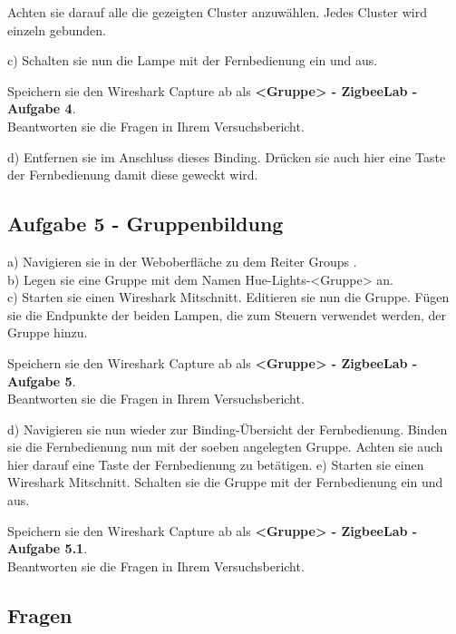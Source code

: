 Achten sie darauf alle die gezeigten Cluster anzuwählen. Jedes Cluster wird einzeln gebunden.

c) Schalten sie nun die Lampe mit der Fernbedienung ein und aus. 

\begin{Hinweis}
    Speichern sie den Wireshark Capture ab als \textbf{\grqq <Gruppe> - ZigbeeLab - Aufgabe 4\grqq{}}. \\
    Beantworten sie die Fragen in Ihrem Versuchsbericht.
\end{Hinweis}

d) Entfernen sie im Anschluss dieses Binding. Drücken sie auch hier eine Taste der Fernbedienung damit diese geweckt wird.

\subsection{Aufgabe 5 - Gruppenbildung}

a) Navigieren sie in der Weboberfläche zu dem Reiter \grqq Groups \grqq{}. \\
b) Legen sie eine Gruppe mit dem Namen \grqq Hue-Lights-<Gruppe> \grqq{} an.\\
c) Starten sie einen Wireshark Mitschnitt. Editieren sie nun die Gruppe. Fügen sie die Endpunkte der beiden Lampen, die zum Steuern verwendet werden, der Gruppe hinzu. \\


\begin{Aufgabe}
    Speichern sie den Wireshark Capture ab als \textbf{\grqq <Gruppe> - ZigbeeLab - Aufgabe 5\grqq{}}. \\
    Beantworten sie die Fragen in Ihrem Versuchsbericht.
\end{Aufgabe}

d) Navigieren sie nun wieder zur Binding-Übersicht der Fernbedienung. Binden sie die Fernbedienung nun mit der soeben
angelegten Gruppe. Achten sie auch hier darauf eine Taste der Fernbedienung zu betätigen.
e) Starten sie einen Wireshark Mitschnitt. Schalten sie die Gruppe mit der Fernbedienung ein und aus.

\begin{Aufgabe}
    Speichern sie den Wireshark Capture ab als \textbf{\grqq <Gruppe> - ZigbeeLab - Aufgabe 5.1\grqq{}}. \\
    Beantworten sie die Fragen in Ihrem Versuchsbericht.
\end{Aufgabe}

\subsection{Fragen}
